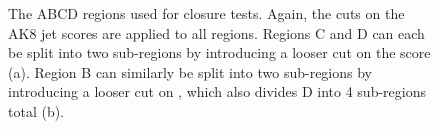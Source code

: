 \begin{figure}[htb]
    \centering
    \qquad
    \caption[The ABCD regions used for closure tests]{
        The ABCD regions used for closure tests. 
        Again, the cuts on the AK8 jet \ParticleNet scores are applied to all regions. 
        Regions C and D can each be split into two sub-regions by introducing a looser cut on the \ABCDNet score (a). 
        Region B can similarly be split into two sub-regions by introducing a looser cut on \detajj, which also divides D into 4 sub-regions total (b).
    }
    \label{fig:vbsvvh_abcd_extra}
\end{figure}

